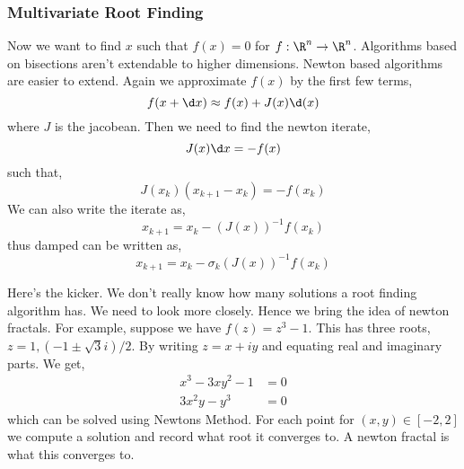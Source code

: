 \subsubsection{Multivariate Root Finding}
Now we want to find $x$ such that $f(x) = 0$ for $f : \R^n \to \R^n$. Algorithms based on bisections aren't extendable to higher dimensions. Newton based algorithms are easier to extend. Again we approximate $f(x)$ by the first few terms,
$$ f(x + \d x) \approx f(x) + J(x)\d (x) $$
where $J$ is the jacobean. Then we need to find the newton iterate,
$$ J(x) \d x = -f(x) $$
such that,
$$ J(x_k) (x_{k+1} - x_k) = -f(x_k) $$
We can also write the iterate as,
$$ x_{k+1} = x_k - (J(x))^{-1}f(x_k) $$
thus damped can be written as,
$$ x_{k+1} = x_k - \sigma_k (J(x))^{-1}f(x_k)  $$


\noindent
Here's the kicker. We don't really know how many solutions a root finding algorithm has. We need to look more closely. Hence we bring the idea of newton fractals. For example, suppose we have $f(z) = z^3 - 1$. This has three roots, $z = 1, (-1 \pm \sqrt 3 i)/2$. By writing $z = x + iy$ and equating real and imaginary parts. We get,
\begin{align*}
  x^3 - 3xy^2 - 1 &= 0 \\
  3x^2y - y^3 &= 0
\end{align*}
which can be solved using Newtons Method. For each point for $(x, y) \in [-2, 2]$ we compute a solution and record what root it converges to. A newton fractal is what this converges to.